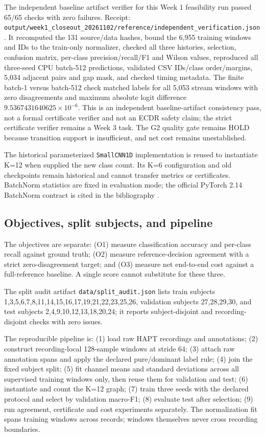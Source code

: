 \documentclass[11pt,a4paper]{article}
\begin{document}
The independent baseline artifact verifier for this Week 1 feasibility run
passed 65/65 checks with zero failures. Receipt:
\nolinkurl{output/week1\_closeout\_20261102/reference/independent\_verification.json}.
It recomputed the 131 source/data hashes, bound the 6,955 training windows and
IDs to the train-only normalizer, checked all three histories, selection,
confusion matrix, per-class precision/recall/F1 and Wilson values, reproduced
all three-seed CPU batch-512 predictions, validated CSV IDs/class order/margins,
5,034 adjacent pairs and gap mask, and checked timing metadata. The finite
batch-1 versus batch-512 check matched labels for all 5,053 stream windows with
zero disagreements and maximum absolute logit difference
$9.5367431640625\times10^{-6}$. This is an independent baseline-artifact
consistency pass, not a formal certificate verifier and not an ECDR safety
claim; the strict certificate verifier remains a Week 3 task. The G2 quality
gate remains HOLD because transition support is insufficient, and net cost
remains unestablished.

The historical parameterized \texttt{SmallCNN1D} implementation is reused to
instantiate K=12 when supplied the new class count. Its K=6 configuration and
old checkpoints remain historical and cannot transfer metrics or certificates.
BatchNorm statistics are fixed in evaluation mode; the official PyTorch 2.14
BatchNorm contract is cited in the bibliography \cite{torch_bn}.

\subsection{Objectives, split subjects, and pipeline}
The objectives are separate: (O1) measure classification accuracy and per-class
recall against ground truth; (O2) measure reference-decision agreement with a
strict zero-disagreement target; and (O3) measure net end-to-end cost against a
full-reference baseline. A single score cannot substitute for these three.

The split audit artifact \texttt{data/split\_audit.json} lists train subjects
{1,3,5,6,7,8,11,14,15,16,17,19,21,22,23,25,26}, validation subjects
{27,28,29,30}, and test subjects {2,4,9,10,12,13,18,20,24}; it reports
subject-disjoint and recording-disjoint checks with zero issues.

The reproducible pipeline is: (1) load raw HAPT recordings and annotations;
(2) construct recording-local 128-sample windows at stride 64; (3) attach raw
annotation spans and apply the declared pure/dominant label rule; (4) join the
fixed subject split; (5) fit channel means and standard deviations across all
supervised training windows only, then reuse them for validation and test;
(6) instantiate and count the K=12 graph; (7) train three seeds with the
declared protocol and select by validation macro-F1; (8) evaluate test after
selection; (9) run agreement, certificate and cost experiments separately.
The normalization fit spans training windows across records; windows themselves
never cross recording boundaries.
\end{document}
